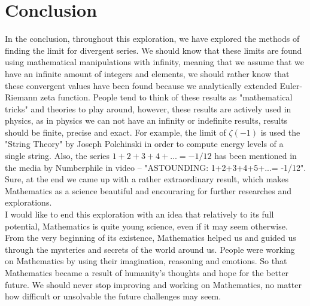\documentclass{beamer}
\begin{document}
\section{Conclusion}

In the conclusion, throughout this exploration, we have explored the methods of finding the limit
for divergent series. We should know that these limits are found using mathematical manipulations
with infinity, meaning that we assume that we have an infinite amount of integers and elements,
we should rather know that these convergent values have been found because we analytically
extended Euler-Riemann zeta function. People tend to think of these results as "mathematical
tricks" and theories to play around, however, these results are actively used in physics, as in physics we
can not have an infinity or indefinite results, results should be finite, precise and exact.
For example,
the limit of $\zeta(-1)$ is used the "String Theory" by Joseph Polchinski\cite{String} in order to compute energy
levels of a single string. Also, the series $1+2+3+4+...=-1/12$ has been mentioned in the media
by Numberphile in video – "ASTOUNDING: 1+2+3+4+5+...= -1/12".\cite{Numberphile} Sure, at the end we came
up with a rather extraordinary result, which makes Mathematics as a science beautiful and
encouraring for further researches and explorations.\\
I would like to end this exploration with an idea that relatively to its full potential, Mathematics is
quite young science, even if it may seem otherwise. From the very beginning of its existence, Mathematics
helped us and guided us through the mysteries and secrets of the world around us. People were working on
Mathematics by using their imagination, reasoning and emotions. So that Mathematics became a result
of humanity's thoughts and hope for the better future. We should never stop improving and working on
Mathematics, no matter how difficult or unsolvable the future challenges may seem.



\end{document}

